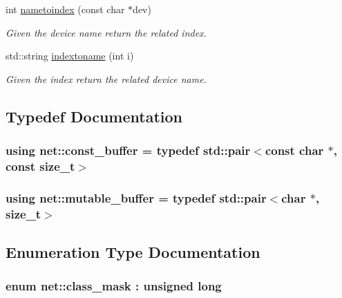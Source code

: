 \begin{DoxyCompactItemize}
int \hyperlink{namespacenet_aa90cbca6e910724bc46d5f4c2b12cddf}{nametoindex} (const char $\ast$dev)
\begin{DoxyCompactList}\small\item\em Given the device name return the related index. \end{DoxyCompactList}\item 
std\-::string \hyperlink{namespacenet_ac7628d7e4c8e89d8ada4d75c292f575f}{indextoname} (int i)
\begin{DoxyCompactList}\small\item\em Given the index return the related device name. \end{DoxyCompactList}\end{DoxyCompactItemize}


\subsection{Typedef Documentation}
\hypertarget{namespacenet_a05639001760fe5164b163078b5ccc2c0}{
\subsubsection[{const\-\_\-buffer}]{\setlength{\rightskip}{0pt plus 5cm}using {\bf net\-::const\-\_\-buffer} = typedef std\-::pair$<$const char $\ast$, const size\-\_\-t$>$}}\label{namespacenet_a05639001760fe5164b163078b5ccc2c0}
\hypertarget{namespacenet_ac0df3fa0efbc044d8a2441906e8f61cb}{
\subsubsection[{mutable\-\_\-buffer}]{\setlength{\rightskip}{0pt plus 5cm}using {\bf net\-::mutable\-\_\-buffer} = typedef std\-::pair$<$char $\ast$, size\-\_\-t$>$}}\label{namespacenet_ac0df3fa0efbc044d8a2441906e8f61cb}


\subsection{Enumeration Type Documentation}
\hypertarget{namespacenet_a1dbd93552dc6ef6fbb0bb79d43ca22fd}{
\subsubsection[{class\-\_\-mask}]{\setlength{\rightskip}{0pt plus 5cm}enum {\bf net\-::class\-\_\-mask} \-: unsigned long\hspace{0.3cm}{\ttfamily [strong]}}}\label{namespacenet_a1dbd93552dc6ef6fbb0bb79d43ca22fd}


